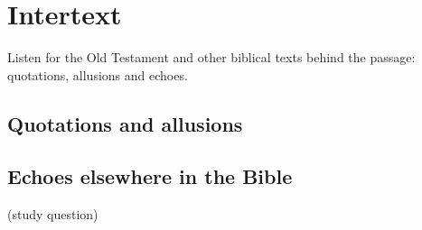 \chapter{Intertext}\label{cap:intertexto}

\begin{objetivo}
Listen for the Old Testament and other biblical texts behind the passage: quotations, allusions and echoes.
\end{objetivo}

\section{Quotations and allusions}

\section{Echoes elsewhere in the Bible}

\begin{pergunta}
(study question)
\end{pergunta}
